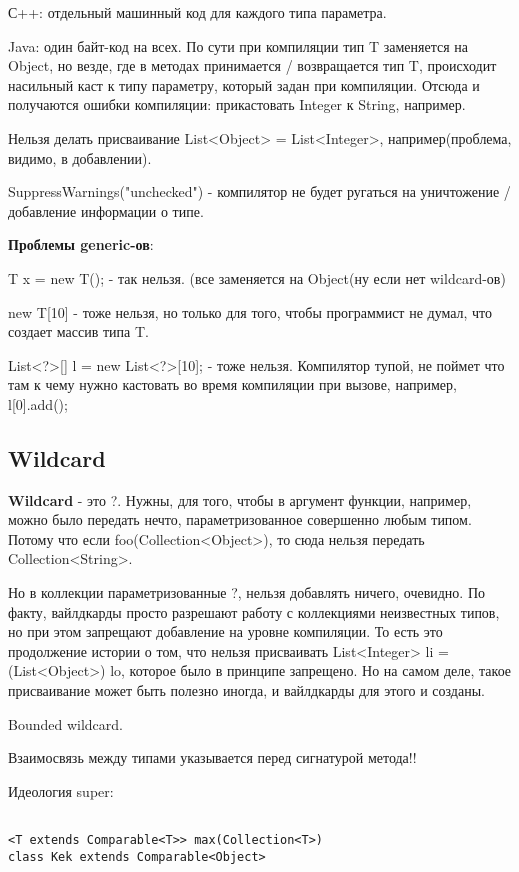 \documentclass{article}
\begin{document}
С++: отдельный машинный код для каждого типа параметра.

Java: один байт-код на всех. По сути при компиляции тип T заменяется на Object, но везде, где в методах принимается / возвращается тип T, происходит насильный каст к типу параметру, который задан при компиляции. Отсюда и получаются ошибки компиляции: прикастовать Integer к String, например.

Нельзя делать присваивание List<Object> = List<Integer>, например(проблема, видимо, в добавлении).

SuppressWarnings("unchecked") - компилятор не будет ругаться на уничтожение / добавление информации о типе.

\textbf{Проблемы generic-ов}: 

T x = new T(); - так нельзя. (все заменяется на Object(ну если нет wildcard-ов)

new T[10] - тоже нельзя, но только для того, чтобы программист не думал, что создает массив типа T.

List<?>[]  l = new List<?>[10]; - тоже нельзя. Компилятор тупой, не поймет что там к чему нужно кастовать во время компиляции при вызове, например, l[0].add();

\subsection{Wildcard}

\textbf{Wildcard} - это ?. Нужны, для того, чтобы в аргумент функции, например, можно было передать нечто, параметризованное совершенно любым типом. Потому что если foo(Collection<Object>), то сюда нельзя передать Collection<String>.

Но в коллекции параметризованные ?, нельзя добавлять ничего, очевидно. По факту, вайлдкарды просто разрешают работу с коллекциями неизвестных типов, но при этом запрещают добавление на уровне компиляции. То есть это продолжение истории о том, что нельзя присваивать List<Integer> li = (List<Object>) lo, которое было в принципе запрещено. Но на самом деле, такое присваивание может быть полезно иногда, и вайлдкарды для этого и созданы.

Bounded wildcard.

Взаимосвязь между типами указывается перед сигнатурой метода!!

Идеология super:

\lstset{language=Java}

\begin{lstlisting} 

<T extends Comparable<T>> max(Collection<T>)
class Kek extends Comparable<Object>

\end{lstlisting}
\end{document}
